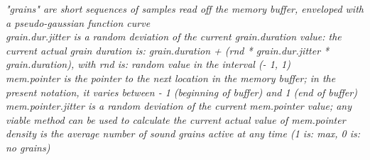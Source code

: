 \begin{center}
    \vspace{0.5cm}
    \textit{"grains" are short sequences of samples read off the memory
    buffer, enveloped with a pseudo-gaussian function curve \\
    grain.dur.jitter is a random deviation of the current
    grain.duration value: the current actual grain duration is:
    grain.duration + (rnd * grain.dur.jitter * grain.duration), with rnd
    is: random value in the interval (- 1, 1) \\
    mem.pointer is the pointer to the next location in the memory
    buffer; in the present notation, it varies between - 1 (beginning
    of buffer) and 1 (end of buffer) \\
    mem.pointer.jitter is a random deviation of the current
    mem.pointer value; any viable method can be used to
    calculate the current actual value of mem.pointer \\
    density is the average number of sound grains active at any
    time (1 is: max, 0 is: no grains)}
    \vspace{0.5cm}
\end{center}

